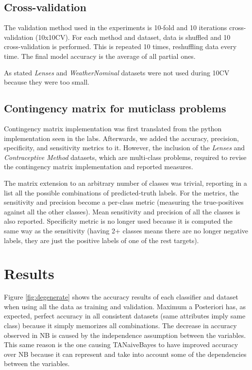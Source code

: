 \documentclass[a4paper,10pt]{article}
\begin{document}
\subsection{Cross-validation}
\label{subsec:validation}

The validation method used in the experiments is 10-fold and 10 iterations cross-validation (10x10CV). For each method and dataset, data is shuffled and 10 cross-validation is performed. This is repeated 10 times, reshuffling data every time. The final model accuracy is the average of all partial ones.

As stated \textit{Lenses} and \textit{WeatherNominal} datasets were not used during 10CV because they were too small.

\subsection{Contingency matrix for muticlass problems}

Contingency matrix implementation was first translated from the python implementation seen in the labs. Afterwards, we added the accuracy, precision, specificity, and sensitivity metrics to it. However, the inclusion of the \textit{Lenses} and \textit{Contraceptive Method} datasets, which are multi-class problems, required to revise the contingency matrix implementation and reported measures. 

The matrix extension to an arbitrary number of classes was trivial, reporting in a list all the possible combinations of predicted-truth labels. For the metrics, the sensitivity and precision become a per-class metric (measuring the true-positives against all the other classes). Mean sensitivity and precision of all the classes is also reported. Specificity metric is no longer used because it is computed the same way as the sensitivity (having 2+ classes means there are no longer negative labels, they are just the positive labels of one of the rest targets).

\section{Results}
\label{subsec:contingency}

Figure \ref{fig:degenerate} shows the accuracy results of each classifier and dataset when using all the data as training and validation. Maximum a Posteriori has, as expected, perfect accuracy in all consistent datasets (same attributes imply same class) because it simply memorizes all combinations. The decrease in accuracy observed in NB is caused by the independence assumption between the variables. This same reason is the one causing TANaiveBayes to have improved accuracy over NB because it can represent and take into account some of the dependencies between the variables.
\end{document}
